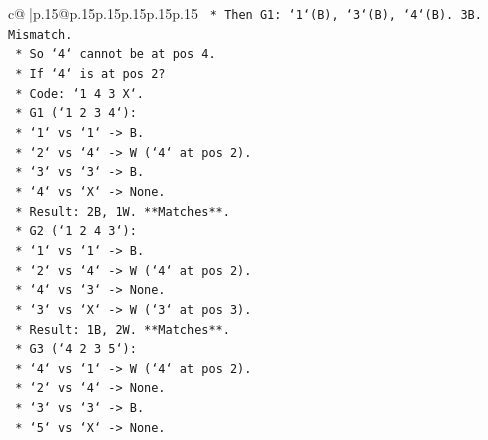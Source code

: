 \documentclass{article}
\begin{document}
{\begin{supertabular}{c@{$\;$}|p{.15\linewidth}@{}p{.15\linewidth}p{.15\linewidth}p{.15\linewidth}p{.15\linewidth}p{.15\linewidth}}
{{{\texttt{                                            *   Then G1: `1`(B), `3`(B), `4`(B). 3B. Mismatch.} \\
\texttt{                                            *   So `4` cannot be at pos 4.} \\
\texttt{                                            *   If `4` is at pos 2?} \\
\texttt{                                            *   Code: `1 4 3 X`.} \\
\texttt{                                            *   G1 (`1 2 3 4`):} \\
\texttt{                                                *   `1` vs `1` {-}> B.} \\
\texttt{                                                *   `2` vs `4` {-}> W (`4` at pos 2).} \\
\texttt{                                                *   `3` vs `3` {-}> B.} \\
\texttt{                                                *   `4` vs `X` {-}> None.} \\
\texttt{                                                *   Result: 2B, 1W. **Matches**.} \\
\texttt{                                            *   G2 (`1 2 4 3`):} \\
\texttt{                                                *   `1` vs `1` {-}> B.} \\
\texttt{                                                *   `2` vs `4` {-}> W (`4` at pos 2).} \\
\texttt{                                                *   `4` vs `3` {-}> None.} \\
\texttt{                                                *   `3` vs `X` {-}> W (`3` at pos 3).} \\
\texttt{                                                *   Result: 1B, 2W. **Matches**.} \\
\texttt{                                            *   G3 (`4 2 3 5`):} \\
\texttt{                                                *   `4` vs `1` {-}> W (`4` at pos 2).} \\
\texttt{                                                *   `2` vs `4` {-}> None.} \\
\texttt{                                                *   `3` vs `3` {-}> B.} \\
\texttt{                                                *   `5` vs `X` {-}> None.} \\
}}}
\end{supertabular}}
\end{document}
